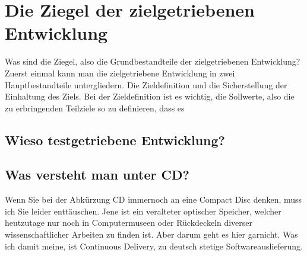 \chapter{Die Ziegel der zielgetriebenen Entwicklung}
\label{chap:die-ziegel-der-zielgetriebenen-entwicklung}
Was sind die Ziegel, also die Grundbestandteile der zielgetriebenen Entwicklung? Zuerst einmal kann man die zielgetriebene Entwicklung in zwei Hauptbestandteile untergliedern. Die Zieldefinition und die Sicherstellung der Einhaltung des Ziels. Bei der Zieldefinition ist es wichtig, die Sollwerte, also die zu erbringenden Teilziele so zu definieren, dass es 
\section{Wieso testgetriebene Entwicklung?}
\label{sec:wieso-testgetriebene-entwicklung}

\section{Was versteht man unter CD?}
\label{sec:was-versteht-man-unter-cd}
Wenn Sie bei der Abkürzung CD immernoch an eine Compact Disc denken, muss ich Sie leider enttäuschen. Jene ist ein veralteter optischer Speicher, welcher heutzutage nur noch in Computermuseen oder Rückdeckeln diverser wissenschaftlicher Arbeiten zu finden ist. Aber darum geht es hier garnicht. Was ich damit meine, ist Continuous Delivery, zu deutsch stetige Softwareauslieferung.

